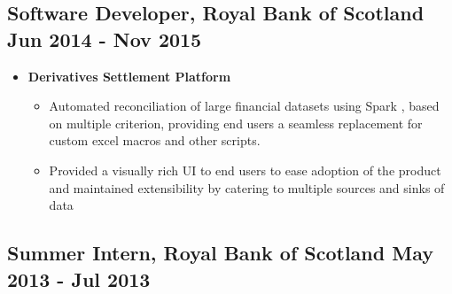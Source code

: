 \begin{itemize}[label=\textperiodcentered,labelindent=0pt,itemindent=1em,leftmargin=0.3cm,itemsep=0pt]
\begin{itemize}[label=\textperiodcentered,labelindent=0pt,itemindent=1em,leftmargin=0.3cm,itemsep=0pt]
\end{itemize}
\subsection*{\small{Software Developer, Royal Bank of Scotland \hfill Jun 2014 - Nov 2015}}
\begin{itemize}[label=\textperiodcentered,labelindent=0pt,itemindent=1em,leftmargin=0.3cm,itemsep=0pt]
    \begin{itemize}
        \item \textbf{Derivatives Settlement Platform}
            \begin{itemize}
                \item {Automated reconciliation of large financial datasets using Spark , based on multiple criterion, providing end users a seamless replacement for custom excel macros and other scripts.}
                \item {Provided a visually rich UI to end users to ease adoption of the product and maintained extensibility by catering to multiple sources and sinks of data}
            \end{itemize}
    \end{itemize}
\end{itemize}
\subsection*{\small{Summer Intern, Royal Bank of Scotland \hfill May 2013 - Jul 2013}}


